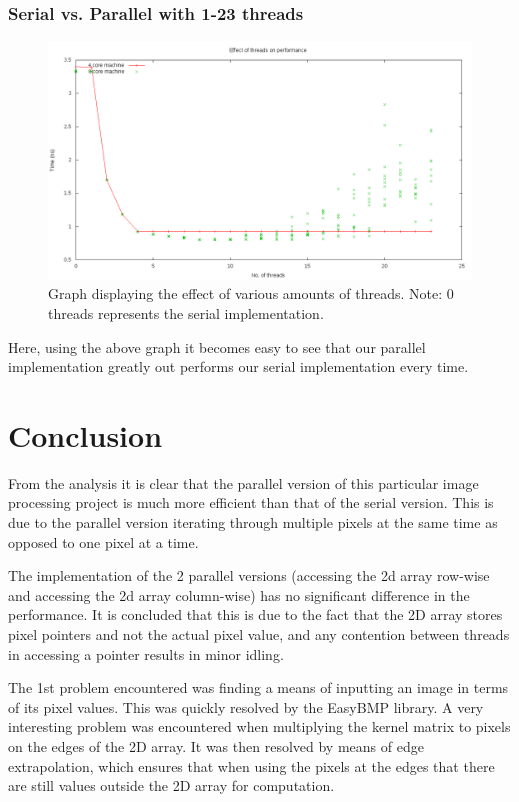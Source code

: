 \documentclass[paper=a4, fontsize=11pt]{scrartcl} %
\numberwithin{equation}{section} %
\numberwithin{figure}{section} %
\numberwithin{table}{section} %
\begin{document}
\subsubsection{Serial vs. Parallel with 1-23 threads}

\begin{figure}[H]
	\centering
	\includegraphics[scale=0.5]{"threads"}
	\caption{Graph displaying the effect of various amounts of threads.
                 Note: 0 threads represents the serial implementation.}
        \label{threads}
\end{figure}

Here, using the above graph it becomes easy to see that our parallel implementation greatly out performs our serial implementation every time.

\section{Conclusion}
From the analysis it is clear that the parallel version of this particular image processing project is much more efficient than that of the serial version. This is due to the parallel version iterating through multiple pixels at the same time as opposed to one pixel at a time.


The implementation of the 2 parallel versions (accessing the 2d array row-wise and accessing the 2d array column-wise) has no significant difference in the performance. It is concluded that this is due to the fact that the 2D array stores pixel pointers and not the actual pixel value, and any contention between threads in accessing a pointer results in minor idling.


The 1st problem encountered was finding a means of inputting an image in terms of its pixel values. This was quickly resolved by the EasyBMP library.
A very interesting problem was encountered when multiplying the kernel matrix to pixels on the edges of the 2D array. It was then resolved by means of edge extrapolation, which ensures that when using the pixels at the edges that there are still values outside the 2D array for computation.
\end{document}
